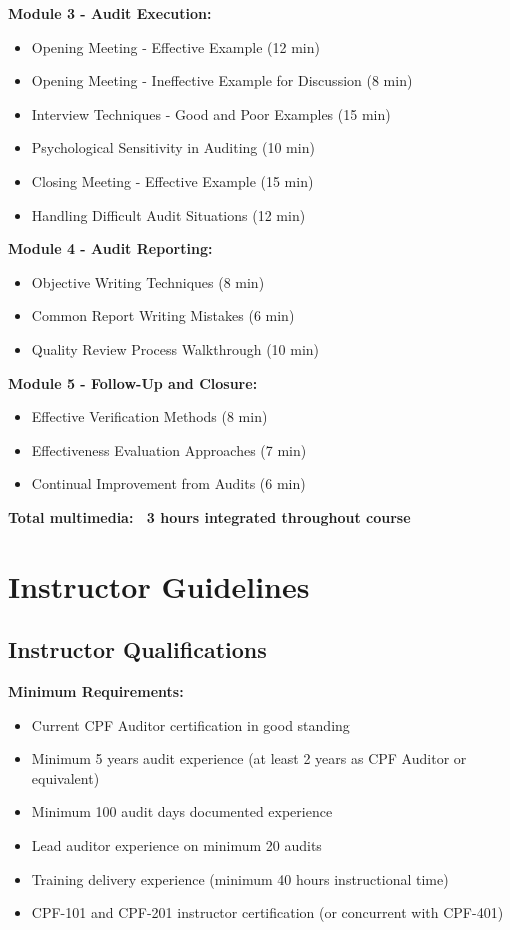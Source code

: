 \documentclass[11pt,a4paper]{article}
\begin{document}
\textbf{Module 3 - Audit Execution:}
\begin{itemize}
\item Opening Meeting - Effective Example (12 min)
\item Opening Meeting - Ineffective Example for Discussion (8 min)
\item Interview Techniques - Good and Poor Examples (15 min)
\item Psychological Sensitivity in Auditing (10 min)
\item Closing Meeting - Effective Example (15 min)
\item Handling Difficult Audit Situations (12 min)
\end{itemize}

\textbf{Module 4 - Audit Reporting:}
\begin{itemize}
\item Objective Writing Techniques (8 min)
\item Common Report Writing Mistakes (6 min)
\item Quality Review Process Walkthrough (10 min)
\end{itemize}

\textbf{Module 5 - Follow-Up and Closure:}
\begin{itemize}
\item Effective Verification Methods (8 min)
\item Effectiveness Evaluation Approaches (7 min)
\item Continual Improvement from Audits (6 min)
\end{itemize}

\textbf{Total multimedia: ~3 hours integrated throughout course}

\section{Instructor Guidelines}

\subsection{Instructor Qualifications}

\textbf{Minimum Requirements:}
\begin{itemize}
\item Current CPF Auditor certification in good standing
\item Minimum 5 years audit experience (at least 2 years as CPF Auditor or equivalent)
\item Minimum 100 audit days documented experience
\item Lead auditor experience on minimum 20 audits
\item Training delivery experience (minimum 40 hours instructional time)
\item CPF-101 and CPF-201 instructor certification (or concurrent with CPF-401)
\end{itemize}
\end{document}
